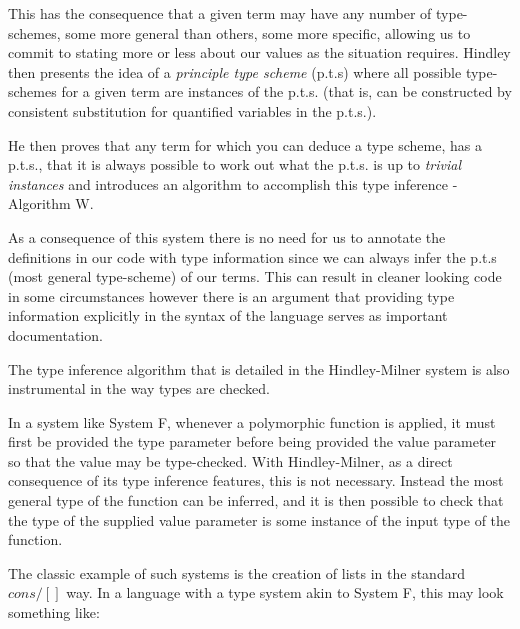             This has the consequence that a given term may have any number of
            type-schemes, some more general than others, some more specific,
            allowing us to commit to stating more or less about our
            values as the situation requires. Hindley then presents
            the idea of a \textit{principle type scheme} (p.t.s) where
            all possible type-schemes for a given term are instances
            of the p.t.s. (that is, can be constructed by consistent
            substitution for quantified variables in the p.t.s.).
            
            He then proves that any term for which you can deduce a type scheme,
            has a p.t.s., that it is always possible to work out what the p.t.s. is
            up to \textit{trivial instances} and introduces an
            algorithm to accomplish this type inference - Algorithm W.

            As a consequence of this system there is no need for us to
            annotate the definitions in our code with type
            information since we can always infer the p.t.s (most
            general type-scheme) of our terms. This can result
            in cleaner looking code in some circumstances however
            there is an argument that providing type information
            explicitly in the syntax of the language serves as
            important documentation.
            
            The type inference algorithm that is detailed in the Hindley-Milner
            system is also instrumental in the way types are checked.
            
            In a system like System F, whenever a polymorphic
            function is applied, it must first be provided the type
            parameter before being provided
            the value parameter so that the value may be
            type-checked. With Hindley-Milner, as a direct consequence
            of its type inference features, this is not
            necessary. Instead the
            most general type of the function can be inferred, and it
            is then possible to check that the type of the supplied
            value parameter is some instance of the input type of the function.
            
            The classic example of such systems is the creation of lists in the
            standard $cons/[]$ way. In a language with a type system akin to
            System F, this may look
            something like:
            
